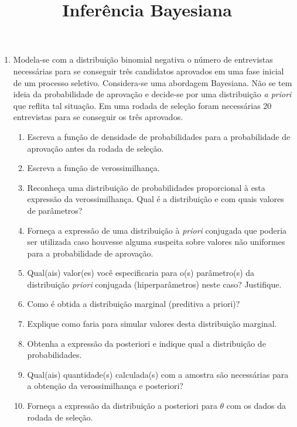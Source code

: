 \documentclass[11pt,a4]{article}\usepackage[]{graphicx}\usepackage[]{xcolor}
\title{Inferência Bayesiana}
\author{}
\date{}
\begin{document}
\maketitle

\pagestyle{empty}
\thispagestyle{empty}

\sloppy

\begin{enumerate}

\item Modela-se com a distribuição binomial negativa o número de entrevistas necessárias para se conseguir três candidatos aprovados em uma fase inicial de um processo seletivo. Considera-se uma abordagem Bayesiana. Não se tem ideia da probabilidade de aprovação e decide-se por uma distribuição {\it a priori} que reflita tal situação. Em uma rodada de seleção foram necessárias 20 entrevistas para se conseguir os três aprovados. 
  \begin{enumerate}
  \item Escreva a função de densidade de probabilidades para a probabilidade de aprovação antes da rodada de seleção.
  \item Escreva a função de verossimilhança. 
  \item Reconheça uma distribuição de probabilidades proporcional à esta expressão da verossimilhança. Qual é a distribuição e com quais valores de parâmetros? 
  \item Forneça a expressão de uma distribuição à {\it priori} conjugada que poderia ser utilizada caso houvesse alguma suspeita sobre valores não uniformes para a probabilidade de aprovação.
  \item Qual(ais) valor(es) você especificaria para o(s) parâmetro(s) da distribuição {\it priori} conjugada (hiperparâmetros) neste caso? Justifique.
  \item Como é obtida a distribuição marginal (preditiva a priori)?
  \item Explique como faria para simular valores desta distribuição marginal.
  \item Obtenha a expressão da posteriori e indique qual a distribuição de probabilidades.
  \item Qual(ais) quantidade(s) calculada(s) com a amostra são necessárias para a obtenção da verossimilhança e posteriori?
  \item Forneça a expressão da distribuição a posteriori para $\theta$ com os dados da rodada de seleção.

\end{enumerate}
\end{enumerate}
\end{document}
